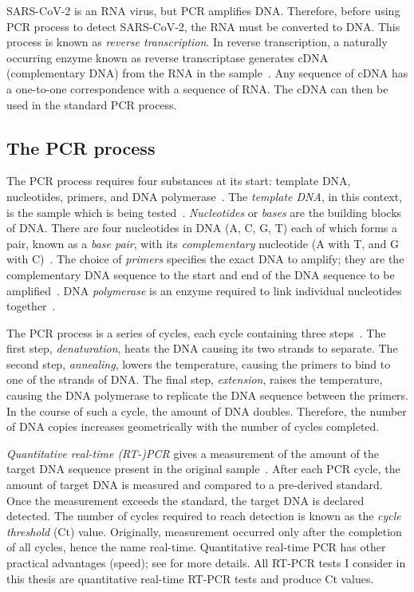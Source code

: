 \documentclass[thesis.tex]{subfiles}
\begin{document}
SARS-CoV-2 is an RNA virus, but PCR amplifies DNA.
Therefore, before using PCR process to detect SARS-CoV-2, the RNA must be converted to DNA.
This process is known as \emph{reverse transcription}.
In reverse transcription, a naturally occurring enzyme known as reverse transcriptase generates cDNA (complementary DNA) from the RNA in the sample~\autocite{valasekPower}.
Any sequence of cDNA has a one-to-one correspondence with a sequence of RNA.
The cDNA can then be used in the standard PCR process.

\subsection{The PCR process} \label{biology-data:sec:PCR-process}


The PCR process requires four substances at its start: template DNA, nucleotides, primers, and DNA polymerase~\autocite{garibyanPCR}.
The \emph{template DNA}, in this context, is the sample which is being tested~\autocite{caseTemplate}.
\emph{Nucleotides} or \emph{bases} are the building blocks of DNA.
There are four nucleotides in DNA (A, C, G, T) each of which forms a pair, known as a \emph{base pair}, with its \emph{complementary} nucleotide (A with T, and G with C)~\autocite{batesBase}.
The choice of \emph{primers} specifies the exact DNA to amplify; they are the complementary DNA sequence to the start and end of the DNA sequence to be amplified~\autocite{garibyanPCR}.
DNA \emph{polymerase} is an enzyme required to link individual nucleotides together~\autocite{garibyanPCR}.

The PCR process is a series of cycles, each cycle containing three steps~\autocite{powledgePCR,garibyanPCR}.
The first step, \emph{denaturation}, heats the DNA causing its two strands to separate.
The second step, \emph{annealing}, lowers the temperature, causing the primers to bind to one of the strands of DNA.
The final step, \emph{extension}, raises the temperature, causing the DNA polymerase to replicate the DNA sequence between the primers. 
In the course of such a cycle, the amount of DNA doubles.
Therefore, the number of DNA copies increases geometrically with the number of cycles completed.

\emph{Quantitative real-time (RT-)PCR} gives a measurement of the amount of the target DNA sequence present in the original sample~\autocite{yangPCRdiagnostics}.
After each PCR cycle, the amount of target DNA is measured and compared to a pre-derived standard.
Once the measurement exceeds the standard, the target DNA is declared detected. 
The number of cycles required to reach detection is known as the \emph{cycle threshold} (Ct) value.
Originally, measurement occurred only after the completion of all cycles, hence the name real-time.
Quantitative real-time PCR has other practical advantages (\eg speed); see \textcite{yangPCRdiagnostics,valasekPower} for more details.
All RT-PCR tests I consider in this thesis are quantitative real-time RT-PCR tests and produce Ct values.
\end{document}
